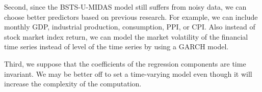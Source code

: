Second, since the BSTS-U-MIDAS model still suffers from noisy data, we can choose better predictors based on previous research. For example, we can include monthly GDP, industrial production, consumption, PPI, or CPI. Also instead of stock market index return, we can model the market volatility of the financial time series instead of level of the time series by using a GARCH model.

Third, we suppose that the coefficients of the regression components are time invariant. We may be better off to set a time-varying model even though it will increase the complexity of the computation.
